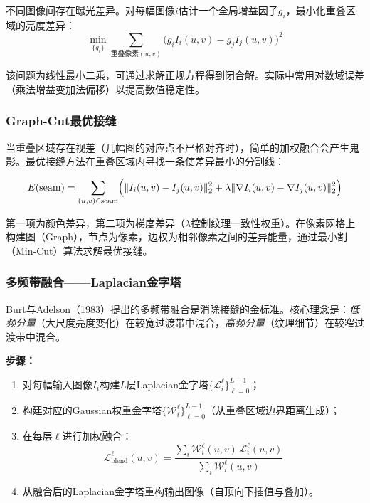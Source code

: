 不同图像间存在曝光差异。对每幅图像$i$估计一个全局增益因子$g_i$，最小化重叠区域的亮度差异：
\begin{equation}
\min_{\{g_i\}} \sum_{\text{重叠像素}(u,v)} \bigl(g_i I_i(u,v) - g_j I_j(u,v)\bigr)^2
\label{eq:gain-comp}
\end{equation}

该问题为线性最小二乘，可通过求解正规方程得到闭合解。实际中常用对数域误差（乘法增益变加法偏移）以提高数值稳定性。

\subsubsection{Graph-Cut最优接缝}

当重叠区域存在视差（几幅图的对应点不严格对齐时），简单的加权融合会产生鬼影。最优接缝方法在重叠区域内寻找一条使差异最小的分割线：

\begin{equation}
E(\text{seam}) = \sum_{(u,v) \in \text{seam}} \Bigl(\|I_i(u,v) - I_j(u,v)\|_2^2
                + \lambda \|\nabla I_i(u,v) - \nabla I_j(u,v)\|_2^2\Bigr)
\label{eq:seam-energy}
\end{equation}

第一项为颜色差异，第二项为梯度差异（$\lambda$控制纹理一致性权重）。在像素网格上构建图（Graph），节点为像素，边权为相邻像素之间的差异能量，通过最小割（Min-Cut）算法求解最优接缝。

\subsubsection{多频带融合——Laplacian金字塔}

Burt与Adelson（1983）提出的多频带融合是消除接缝的金标准。核心理念是：\emph{低频分量}（大尺度亮度变化）在较宽过渡带中混合，\emph{高频分量}（纹理细节）在较窄过渡带中混合。

\begin{resultbox}[Laplacian多频带融合]
\textbf{步骤：}
\begin{enumerate}[leftmargin=*]
  \item 对每幅输入图像$I_i$构建$L$层Laplacian金字塔$\{\mathcal{L}_i^\ell\}_{\ell=0}^{L-1}$；
  \item 构建对应的Gaussian权重金字塔$\{\mathcal{W}_i^\ell\}_{\ell=0}^{L-1}$（从重叠区域边界距离生成）；
  \item 在每层$\ell$进行加权融合：
  \[
  \mathcal{L}_{\text{blend}}^\ell(u,v) =
  \frac{\sum_i \mathcal{W}_i^\ell(u,v)\,\mathcal{L}_i^\ell(u,v)}{\sum_i \mathcal{W}_i^\ell(u,v)}
  \]
  \item 从融合后的Laplacian金字塔重构输出图像（自顶向下插值与叠加）。
\end{enumerate}
\end{resultbox}

